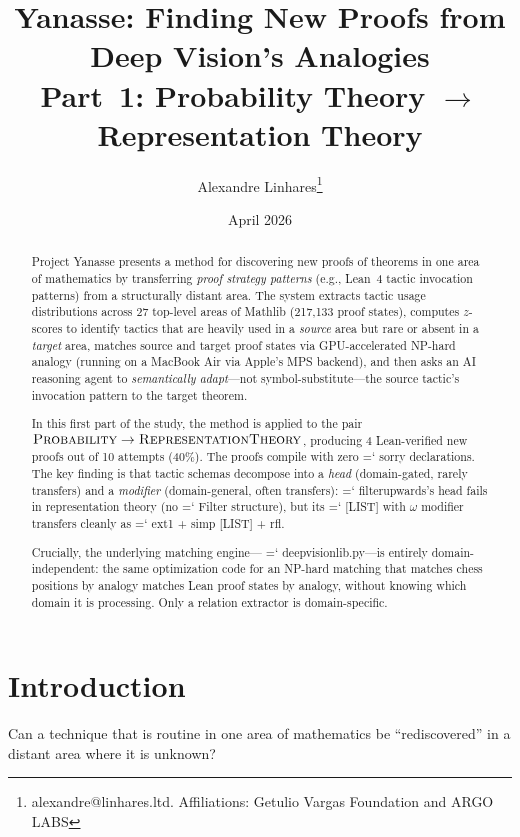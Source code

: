 \documentclass[11pt]{article}
\title{Yanasse: Finding New Proofs from Deep Vision's Analogies\\[0.5em]
\large Part~1: Probability Theory $\to$ Representation Theory}
\author{Alexandre Linhares\thanks{alexandre@linhares.ltd. Affiliations: Getulio Vargas Foundation and ARGO LABS}}
\date{April 2026}
\renewcommand{\texttt}[1]{%
  \begingroup\ttfamily\hyphenchar\font=`\-\relax
  \def\_{\textunderscore\discretionary{}{}{}}%
  #1\endgroup}
\theoremstyle{definition}
\theoremstyle{remark}
\begin{document}
\maketitle

\begin{abstract}
Project Yanasse presents a method for discovering new proofs of theorems in one
area of mathematics by transferring \emph{proof strategy patterns} (e.g., Lean~4 tactic invocation patterns) from a
structurally distant area.  The system extracts tactic usage distributions
across 27 top-level areas of Mathlib (217{,}133 proof states), computes
$z$-scores to identify tactics that are heavily used in a \emph{source}
area but rare or absent in a \emph{target} area, matches source and
target proof states via GPU-accelerated NP-hard analogy
(running on a MacBook Air via Apple's MPS backend), and then asks an
AI reasoning agent to \emph{semantically adapt}---not symbol-substitute---the
source tactic's invocation pattern to the target theorem.

In this first part of the study, the method is applied to the pair
$\textsc{Probability} \to \textsc{RepresentationTheory}$, producing
4 Lean-verified new proofs out of 10 attempts (40\%).  The proofs compile with
zero \texttt{sorry} declarations.  The key finding is that tactic
schemas decompose into a \emph{head} (domain-gated, rarely transfers)
and a \emph{modifier} (domain-general, often transfers):
\texttt{filter\_upwards}'s head fails in representation theory
(no \texttt{Filter} structure), but its \texttt{[LIST] with $\omega$}
modifier transfers cleanly as \texttt{ext1 + simp [LIST] + rfl}.

Crucially, the underlying matching engine---\texttt{deep\_vision\_lib.py}---is
entirely domain-independent: the same optimization code for an NP-hard
matching that matches chess positions by analogy matches Lean proof states
by analogy, without knowing which domain it is processing.  Only a
relation extractor is domain-specific.
\end{abstract}

\newpage
\tableofcontents
\newpage

\section{Introduction}\label{sec:intro}

Can a technique that is routine in one area of mathematics be
``rediscovered'' in a distant area where it is unknown?
\end{document}
